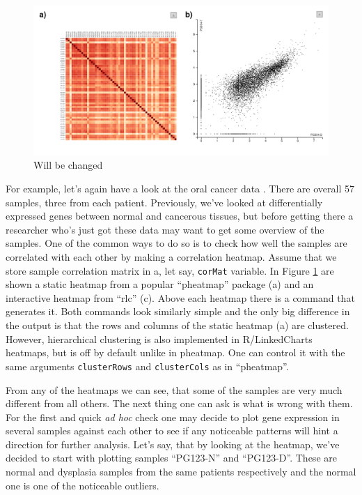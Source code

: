\documentclass[twocolumn,10pt]{article}
\begin{document}
\begin{figure}
  \includegraphics[width=\textwidth]{FigE/figE.png}
  \caption{Will be changed}
  \label{FigE}
\end{figure}
 
For example, let's again have a look at the oral cancer data \citep{conway_2015}. There are overall 57 samples, three from each patient. Previously, we've looked at differentially expressed genes between normal and cancerous tissues, but before getting there a researcher who's just got these data may want to get some overview of the samples. One of the common ways to do so is to check how well the samples are correlated with each other by making a correlation heatmap. Assume that we store sample correlation matrix in a, let say, \texttt{corMat} variable. In Figure \ref{FigE} are shown a static heatmap from a popular ``pheatmap'' package (a) and an interactive heatmap from ``rlc'' (c). Above each heatmap there is a command that generates it. Both commands look similarly simple and the only big difference in the output is that the rows and columns of the static heatmap (a) are clustered. However, hierarchical clustering is also implemented in R/LinkedCharts heatmaps, but is off by default unlike in pheatmap. One can control it with the same arguments \texttt{clusterRows} and \texttt{clusterCols} as in ``pheatmap''.

From any of the heatmaps we can see, that some of the samples are very much different from all others. The next thing one can ask is what is wrong with them. For the first and quick \emph{ad hoc} check one may decide to plot gene expression in several samples against each other to see if any noticeable patterns will hint a direction for further analysis. Let's say, that by looking at the heatmap, we've decided to start with plotting samples ``PG123-N'' and ``PG123-D''. These are normal and dysplasia samples from the same patients respectively and the normal one is one of the noticeable outliers.
\end{document}
